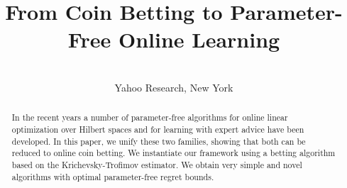 \documentclass[wcp]{jmlr}
\author{\Name{Francesco Orabona} \Email{francesco@orabona.com}\and
\Name{D\'avid P\'al} \Email{dpal@yahoo-inc.com}\\
\addr Yahoo Research, New York}
\title{From Coin Betting to Parameter-Free Online Learning}
\begin{document}
\maketitle

\begin{abstract}
In the recent years a number of parameter-free algorithms for online linear
optimization over Hilbert spaces and for learning with expert advice have been
developed.
In this paper, we unify these two families, showing that both can be
reduced to online coin betting. We instantiate our framework using a betting
algorithm based on the Krichevsky-Trofimov estimator. We obtain very simple and novel
algorithms with optimal parameter-free regret bounds.
\end{abstract}



%









\appendix




\end{document}
